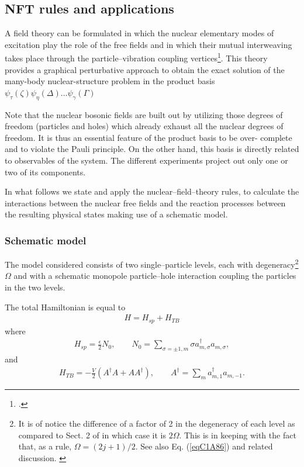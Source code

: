  
\subsection{NFT rules and applications}\label{Sect1.7.2}
A field theory can be formulated in which the nuclear elementary modes of
excitation play the role of the free fields and in which their mutual interweaving takes place through the particle--vibration coupling vertices\footnote{\cite{Bes:74,Broglia:76,Bohr:75,Bohr:76,Mottelson:76}.}.
This theory provides a graphical perturbative approach to obtain the exact
solution of the many-body nuclear-structure problem in the product basis $\psi_\tau(\zeta)\psi_\eta(\Delta)\dots\psi_\gamma(\Gamma)$


Note that the nuclear bosonic fields are built out by utilizing those degrees
of freedom (particles and holes) which already exhaust all the nuclear degrees
of freedom. It is thus an essential feature of the product basis to be over-
complete and to violate the Pauli principle. On the other hand, this basis is
directly related to observables of the system. The different experiments project out only one or two of its components.


In what follows we state and apply the nuclear--field--theory rules, to calculate the interactions between the nuclear free fields and the reaction processes
between the resulting physical states making use of a schematic model. \subsubsection{Schematic model}
The model considered consists of two single--particle levels, each with degeneracy\footnote{It is of notice the difference of a factor of 2 in the degeneracy of each level as compared to Sect. 2 of \cite{Bortignon:77} in which case it is $2\Omega$. This is in keeping with the fact that, as a rule, $\Omega=(2j+1)/2$. See also Eq. (\ref{eqC1A86}) and related discussion. \label{fnlabel}} $\Omega$ and with a schematic monopole particle--hole interaction coupling the particles in the two levels.

The total Hamiltonian is equal to
\begin{align}\label{eqC1A13} 
H=H_{sp}+H_{TB}
\end{align}
where
\begin{align}\label{eqC1A14} 
H_{sp}=\frac{\epsilon}{2}N_0,\quad\quad N_0=\sum_{\sigma=\pm 1,m}\sigma a^{\dagger}_{m,\sigma}a_{m,\sigma},
\end{align}
and
\begin{align}\label{eqC1A15} 
H_{TB}=-\frac{V}{2}\left(A^\dagger A+AA^\dagger\right),\quad\quad A^\dagger=\sum_m a^\dagger_{m,1}a_{m,-1}.
\end{align}


